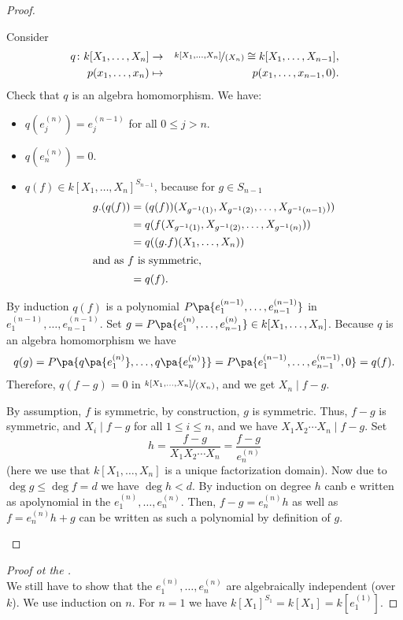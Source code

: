 \documentclass[12pt,a4paper]{scrartcl}
\theoremstyle{cplain}
\theoremstyle{cplain}
\theoremstyle{cplain}
\theoremstyle{definition}
\begin{document}
\begin{otherlanguage}{english}
\begin{proof}
\begin{description}
    Consider
    \begin{eqnarray*}
      q \colon k[X_1,\ldots,X_n] &\to& \nicefrac{k[X_1,\ldots,X_n]}{(X_n)} \cong k[X_1,\ldots,X_{n-1}], \\
      p(x_1,\ldots,x_n) &\mapsto& p(x_1,\ldots,x_{n-1},0).
    \end{eqnarray*}
    Check that $q$ is an algebra homomorphism. We have:
    \begin{itemize}
      \item $q(e_j^{(n)}) = e_j^{(n-1)}$ for all $0\le j >n$.
      \item $q(e_n^{(n)}) = 0$.
      \item $q(f) \in k[X_1,\ldots,X_n]^{S_{n-1}}$, because for $g \in S_{n-1}$
      \begin{align*}
        g.(q(f)) &= (q(f))(X_{g^{-1}(1)},X_{g^{-1}(2)},\ldots,X_{g^{-1}(n-1)})) \\
        &= q(f(X_{g^{-1}(1)},X_{g^{-1}(2)},\ldots,X_{g^{-1}(n)})) \\
        &= q((g.f)(X_1,\ldots,X_n)) \\ \intertext{and as $f$ is symmetric,}
        &= q(f).
      \end{align*}
    \end{itemize}
    By induction $q(f)$ is a polynomial $P\pa{e^{(n-1)}_1,\ldots,e_{n-1}^{(n-1)}}$ in $e^{(n-1)}_1,\ldots,e_{n-1}^{(n-1)}$. Set $g= P\pa{e_1^{(n)},\ldots,e_{n-1}^{(n)}}\in k[X_1,\ldots,X_n]$. Because $q$ is an algebra homomorphism we have \[q(g) = P\pa{q\pa{e_1^{(n)}},\ldots,q\pa{e_n^{(n)}}} = P\pa{e_1^{(n-1)},\ldots,e_{n-1}^{(n-1)},0} = q(f). \] Therefore, $q(f-g) = 0$ in $\nicefrac{k[X_1,\ldots,X_n]}{(X_n)}$, and we get $X_n \mid f-g$.
    
    By assumption, $f$ is symmetric, by construction, $g$ is symmetric. Thus, $f-g$ is symmetric, and $X_i \mid f-g$ for all $1 \le i \le n$, and we have $X_1X_2\cdots X_n \mid f-g$. Set \[ h = \frac{f-g}{X_1X_2\cdots X_n} = \frac{f-g}{e_n^{(n)}} \] (here we use that $k[X_1,\ldots,X_n]$ is a unique factorization domain). Now due to $\deg g \le \deg f = d$ we have $\deg h < d $. By induction on degree $h$ canb e written as apolynomial in the $e_1^{(n)},\ldots,e_n^{(n)}$. Then, $f -g = e_n^{(n)}h$ as well as $f= e_n^{(n)}h +g$ can be written as such a polynomial by definition of $g$.
    \qedhere
  \end{description}
\end{proof}

\begin{proof}[Proof ot the ]
  \leavevmode\\
  We still have to show that the $e_1^{(n)},\ldots,e_n^{(n)}$ are algebraically independent (over $k$). We use induction on $n$. For $n=1$ we have $k[X_1]^{S_1} = k[X_1] = k[e_1^{(1)}]$.
  

\end{proof}
\end{otherlanguage}
\end{document}
